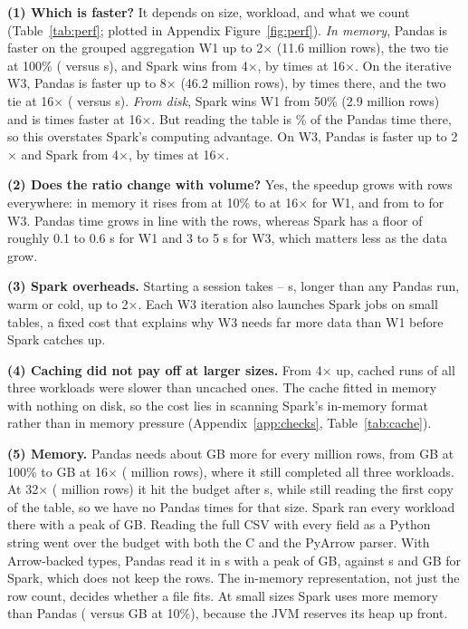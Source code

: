 \documentclass[acmtog,nonacm]{acmart}
\begin{document}
\textbf{(1) Which is faster?} It depends on size, workload, and what we count (Table~\ref{tab:perf}; plotted in Appendix Figure~\ref{fig:perf}). \emph{In memory}, Pandas is faster on the grouped aggregation W1 up to 2$\times$ (11.6 million rows), the two tie at 100\% (\memWOneFullPd{} versus \memWOneFullSp{} s), and Spark wins from 4$\times$, by \memWOneSixteen{} times at 16$\times$. On the iterative W3, Pandas is faster up to 8$\times$ (46.2 million rows), by \memWThreeEightInv{} times there, and the two tie at 16$\times$ (\memWThreeSixPd{} versus \memWThreeSixSp{} s). \emph{From disk}, Spark wins W1 from 50\% (2.9 million rows) and is \spWOneSixteen{} times faster at 16$\times$. But reading the table is \loadShareSixteen\% of the Pandas time there, so this overstates Spark's computing advantage. On W3, Pandas is faster up to 2$\times$ and Spark from 4$\times$, by \spWThreeSixteen{} times at 16$\times$.

\textbf{(2) Does the ratio change with volume?} Yes, the speedup grows with rows everywhere: in memory it rises from \memWOneTen{} at 10\% to \memWOneSixteen{} at 16$\times$ for W1, and from \memWThreeTen{} to \memWThreeSixteen{} for W3. Pandas time grows in line with the rows, whereas Spark has a floor of roughly 0.1 to 0.6 s for W1 and 3 to 5 s for W3, which matters less as the data grow.

\textbf{(3) Spark overheads.} Starting a session takes \initMin--\initMax{} s, longer than any Pandas run, warm or cold, up to 2$\times$. Each W3 iteration also launches Spark jobs on small tables, a fixed cost that explains why W3 needs far more data than W1 before Spark catches up.

\textbf{(4) Caching did not pay off at larger sizes.} From 4$\times$ up, cached runs of all three workloads were slower than uncached ones. The cache fitted in memory with nothing on disk, so the cost lies in scanning Spark's in-memory format rather than in memory pressure (Appendix~\ref{app:checks}, Table~\ref{tab:cache}).

\textbf{(5) Memory.} Pandas needs about \pdPerMillion{} GB more for every million rows, from \pdMemFull{} GB at 100\% to \pdMemSixteen{} GB at 16$\times$ (\lastRows{} million rows), where it still completed all three workloads. At 32$\times$ (\oomRows{} million rows) it hit the budget after \oomSecs{} s, while still reading the first copy of the table, so we have no Pandas times for that size. Spark ran every workload there with a peak of \spMemOom{} GB. Reading the full CSV with every field as a Python string went over the budget with both the C and the PyArrow parser. With Arrow-backed types, Pandas read it in \wzArrowTime{} s with a peak of \wzArrowPeak{} GB, against \wzSparkTime{} s and \wzSparkPeak{} GB for Spark, which does not keep the rows. The in-memory representation, not just the row count, decides whether a file fits. At small sizes Spark uses more memory than Pandas (\spMemTen{} versus \pdMemTen{} GB at 10\%), because the JVM reserves its heap up front.
\end{document}
